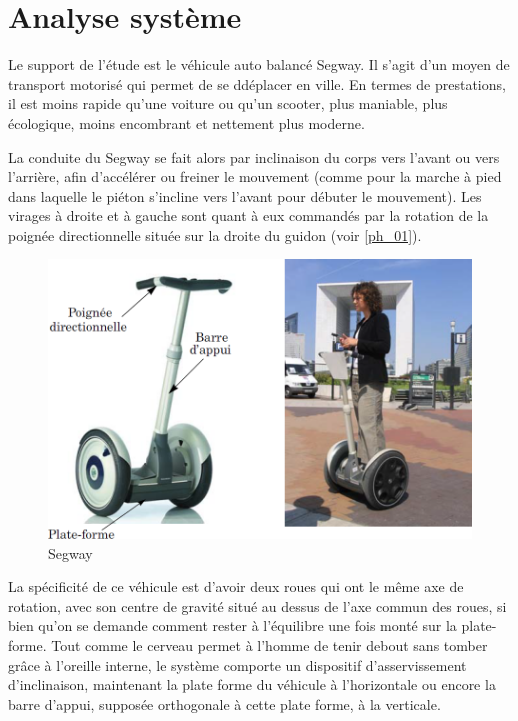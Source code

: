 \documentclass[10pt,fleqn]{article} %
\begin{document}

\vspace{4.5cm}
\pagestyle{fancy}
\thispagestyle{plain}

\def\columnseprulecolor{\color{ocre}}
\setlength{\columnseprule}{0.4pt} 




\section{Analyse système}

\ifprof
\else
Le support de l’étude est le véhicule auto balancé Segway. Il s’agit d’un moyen de transport motorisé qui permet de se ddéplacer en ville. En termes de prestations, il est moins rapide qu’une voiture ou qu’un scooter, plus maniable, plus écologique, moins encombrant et nettement plus moderne.

La conduite du Segway se fait alors par inclinaison du corps vers l’avant ou vers l’arrière, afin d’accélérer ou freiner le mouvement (comme pour la marche à pied dans laquelle le piéton s’incline vers l’avant pour débuter le mouvement). Les virages à droite et à gauche sont quant à eux commandés par la rotation de la poignée directionnelle située sur la droite du guidon (voir \autoref{ph_01}).

\begin{figure}[H]
\centering
\includegraphics[width=0.7\linewidth]{ph_01}
\caption{Segway \label{ph_01}}
\end{figure}


La spécificité de ce véhicule est d’avoir deux roues qui ont le même axe de rotation, avec son centre de gravité situé au dessus de l’axe commun des roues, si bien qu’on se demande comment rester à l’équilibre une fois monté sur la plate-forme. Tout comme le cerveau permet à l’homme de tenir debout sans tomber grâce à l’oreille interne, le système comporte un dispositif d’asservissement d’inclinaison, maintenant la plate forme du véhicule à l’horizontale ou encore la barre d’appui, supposée orthogonale à cette plate forme, à la verticale.
\end{document}
